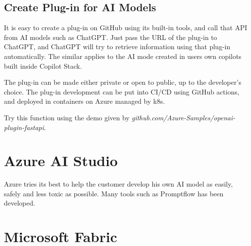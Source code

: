 \subsection{Create Plug-in for AI Models}

It is easy to create a plug-in on GitHub using its built-in tools, and call that API from AI models such as ChatGPT. Just pass the URL of the plug-in to ChatGPT, and ChatGPT will try to retrieve information using that plug-in automatically. The similar applies to the AI mode created in users own copilots built inside Copilot Stack.

The plug-in can be made either private or open to public, up to the developer's choice. The plug-in development can be put into CI/CD using GitHub actions, and deployed in containers on Azure managed by k8s.

Try this function using the demo given by \textit{github.com/Azure-Samples/openai-plugin-fastapi}.

\section{Azure AI Studio}

Azure tries its best to help the customer develop his own AI model as easily, safely and less toxic as possible. Many tools such as Promptflow has been developed.

\section{Microsoft Fabric}

